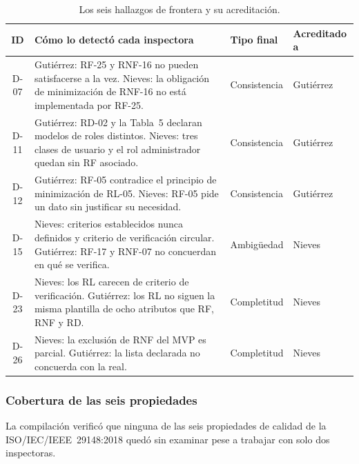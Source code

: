 \documentclass[journal,onecolumn]{IEEEtran}
\begin{document}
	\begin{table}[h!]
		\centering
		\caption{Los seis hallazgos de frontera y su acreditación.}
		\label{tab:hallazgos-frontera}
		\begin{tabular}{
				c
				>{\raggedright\arraybackslash}p{7.5cm}
				>{\raggedright\arraybackslash}p{2.3cm}
				>{\raggedright\arraybackslash}p{1.8cm}
			}
			\toprule
			\textbf{ID} & \textbf{Cómo lo detectó cada inspectora} & \textbf{Tipo final} & \textbf{Acreditado a} \\
			\midrule
			D-07 & Gutiérrez: RF-25 y RNF-16 no pueden satisfacerse a la vez.
			Nieves: la obligación de minimización de RNF-16 no está
			implementada por RF-25. & Consistencia & Gutiérrez \\
			\addlinespace
			D-11 & Gutiérrez: RD-02 y la Tabla~5 declaran modelos de roles
			distintos. Nieves: tres clases de usuario y el rol administrador
			quedan sin RF asociado. & Consistencia & Gutiérrez \\
			\addlinespace
			D-12 & Gutiérrez: RF-05 contradice el principio de minimización de
			RL-05. Nieves: RF-05 pide un dato sin justificar su necesidad. &
			Consistencia & Gutiérrez \\
			\addlinespace
			D-15 & Nieves: criterios establecidos nunca definidos y criterio de
			verificación circular. Gutiérrez: RF-17 y RNF-07 no concuerdan en
			qué se verifica. & Ambigüedad & Nieves \\
			\addlinespace
			D-23 & Nieves: los RL carecen de criterio de verificación.
			Gutiérrez: los RL no siguen la misma plantilla de ocho atributos que
			RF, RNF y RD. & Completitud & Nieves \\
			\addlinespace
			D-26 & Nieves: la exclusión de RNF del MVP es parcial. Gutiérrez: la
			lista declarada no concuerda con la real. & Completitud & Nieves \\
			\bottomrule
		\end{tabular}
	\end{table}
	
	\subsubsection{Cobertura de las seis propiedades}
	
	La compilación verificó que ninguna de las seis propiedades de calidad de la
	ISO/IEC/IEEE~29148:2018 quedó sin examinar pese a trabajar con solo dos
	inspectoras.
	
\end{document}
